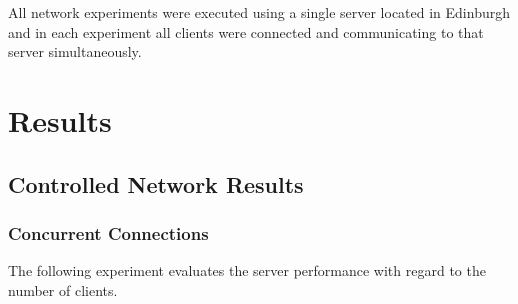 \documentclass[bsc,frontabs,twoside,singlespacing,parskip,deptreport]{infthesis}     %
\begin{document}
All network experiments were executed using a single server located in Edinburgh and in each experiment all clients were connected and communicating to that server simultaneously.

\section{Results}
\subsection{Controlled Network Results}
\subsubsection{Concurrent Connections}
The following experiment evaluates the server performance with regard to the number of clients.
\end{document}
